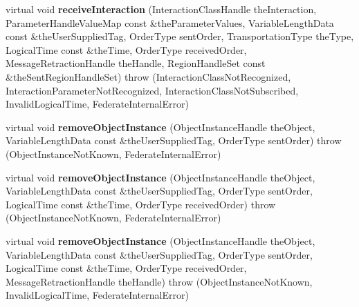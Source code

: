 \begin{DoxyCompactItemize}
\item 
\hypertarget{class_example_fed_amb_a5e693e84c59a8a36fe741b117c9817a7}{
virtual void {\bfseries receiveInteraction} (InteractionClassHandle theInteraction, ParameterHandleValueMap const \&theParameterValues, VariableLengthData const \&theUserSuppliedTag, OrderType sentOrder, TransportationType theType, LogicalTime const \&theTime, OrderType receivedOrder, MessageRetractionHandle theHandle, RegionHandleSet const \&theSentRegionHandleSet)  throw (InteractionClassNotRecognized, InteractionParameterNotRecognized, InteractionClassNotSubscribed, InvalidLogicalTime, FederateInternalError)}
\label{class_example_fed_amb_a5e693e84c59a8a36fe741b117c9817a7}

\item 
\hypertarget{class_example_fed_amb_a0b85c3c2443e2dcd968d8e896ab387d9}{
virtual void {\bfseries removeObjectInstance} (ObjectInstanceHandle theObject, VariableLengthData const \&theUserSuppliedTag, OrderType sentOrder)  throw (ObjectInstanceNotKnown, FederateInternalError)}
\label{class_example_fed_amb_a0b85c3c2443e2dcd968d8e896ab387d9}

\item 
\hypertarget{class_example_fed_amb_ace532e52fcab118c2b7623a4ecba9a42}{
virtual void {\bfseries removeObjectInstance} (ObjectInstanceHandle theObject, VariableLengthData const \&theUserSuppliedTag, OrderType sentOrder, LogicalTime const \&theTime, OrderType receivedOrder)  throw (ObjectInstanceNotKnown, FederateInternalError)}
\label{class_example_fed_amb_ace532e52fcab118c2b7623a4ecba9a42}

\item 
\hypertarget{class_example_fed_amb_ad56676c5bbd958dc603bafac1b6cc61d}{
virtual void {\bfseries removeObjectInstance} (ObjectInstanceHandle theObject, VariableLengthData const \&theUserSuppliedTag, OrderType sentOrder, LogicalTime const \&theTime, OrderType receivedOrder, MessageRetractionHandle theHandle)  throw (ObjectInstanceNotKnown, InvalidLogicalTime, FederateInternalError)}
\label{class_example_fed_amb_ad56676c5bbd958dc603bafac1b6cc61d}

\end{DoxyCompactItemize}
